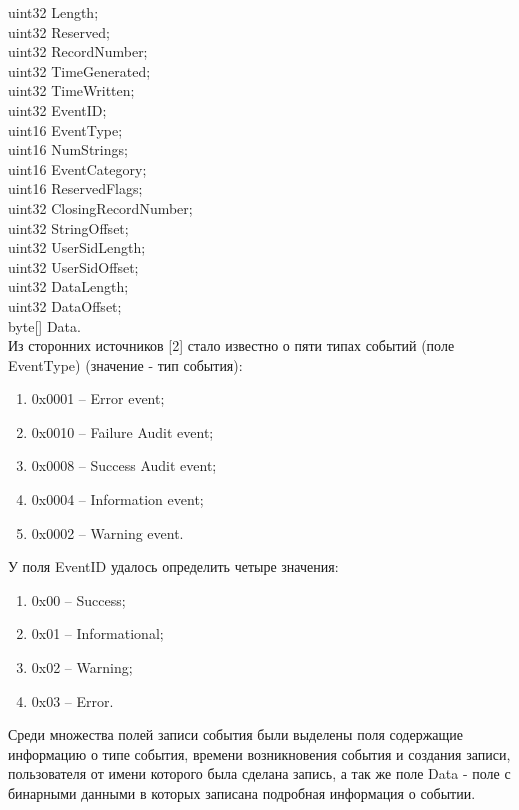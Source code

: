 uint32 Length; \\
uint32 Reserved; \\
uint32 RecordNumber; \\
uint32 TimeGenerated; \\
uint32 TimeWritten; \\
uint32 EventID; \\
uint16 EventType; \\
uint16 NumStrings; \\
uint16 EventCategory; \\
uint16 ReservedFlags; \\
uint32 ClosingRecordNumber; \\
uint32 StringOffset; \\
uint32 UserSidLength; \\
uint32 UserSidOffset; \\
uint32 DataLength; \\
uint32 DataOffset; \\
byte[] Data. \\

Из сторонних источников [2] стало известно о пяти типах событий (поле EventType) (значение - тип события):

\begin{enumerate}
\item 0x0001 – Error event;
\item 0x0010 – Failure Audit event;
\item 0x0008 – Success Audit event;
\item 0x0004 – Information event;
\item 0x0002 – Warning event.
\end{enumerate}

У поля EventID удалось определить четыре значения: 

\begin{enumerate}
\item 0x00 – Success; \\
\item 0x01 – Informational;\\
\item 0x02 – Warning; \\
\item 0x03 – Error. \\
\end{enumerate}

Среди множества полей записи события были выделены поля содержащие информацию о типе события, времени возникновения события и создания записи, пользователя от имени которого была сделана запись, а так же поле Data - поле с бинарными данными в которых записана подробная информация о событии.

